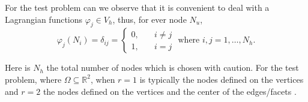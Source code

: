 For the test problem can we observe that it is convenient to deal with a Lagrangian functions $\varphi _{j} \in V_{h}$, thus, for ever node $N_{u}$, \[
\varphi _{j}\left( N_{i} \right)  = \delta _{ij} = \begin{cases}
    0, \quad & i \neq j \\
    1,\quad & i=j
\end{cases}
\text{ where } i,j = 1,\ldots, N_{h}.
\]

Here is $N_{h}$  the total number of nodes which is chosen with caution. For the test problem, where $\Omega \subseteq \mathbb{R} ^{2} $, when $r=1$ is typically the nodes defined on the vertices and $ r=2 $ the nodes defined on the vertices and the
center of the edges/facets \cite{quartdiff}.















